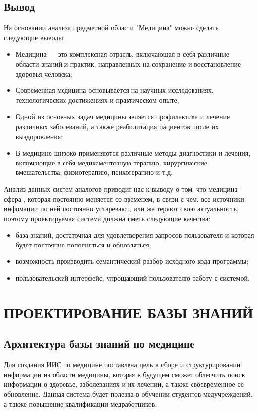 \subsection{Вывод}
На основании анализа предметной области "Медицина" можно сделать следующие выводы:

\begin{itemize}
	\item Медицина — это комплексная отрасль, включающая в себя различные области знаний и практик, направленных на сохранение и восстановление здоровья человека;
	
	\item Современная медицина основывается на научных исследованиях, технологических достижениях и практическом опыте;
	
	\item Одной из основных задач медицины является профилактика и лечение различных заболеваний, а также реабилитация пациентов после их выздоровления;
	
	\item В медицине широко применяются различные методы диагностики и лечения, включающие в себя медикаментозную терапию, хирургические вмешательства, физиотерапию, психотерапию и т.д.
\end{itemize}{}
Анализ данных систем-аналогов приводит нас к выводу о том, что медицина - сфера , которая постоянно меняется со временем, в связи с чем, все источники инфомации по ней постоянно устаревают, или же теряют свою актуальность, поэтому проектируемая система должна иметь следующие качества:
\begin{itemize}
	\item {база знаний, достаточная для удовлетворения запросов пользователя и которая будет постоянно пополняться и обновляться;}
	
	\item{возможность производить семантический разбор исходного кода программы;}
	
	\item{пользовательский интерфейс, упрощающий пользователю работу с системой.}
\end{itemize}

\section{ПРОЕКТИРОВАНИЕ БАЗЫ ЗНАНИЙ}
\subsection{Архитектура базы знаний по медицине}
Для создания ИИС по медицине поставлена цель в сборе и структурировании информации из области медицины, которая в будущем сможет облегчить поиск информации о здоровье, заболеваниях и их лечении, а также своевременное её обновление. Данная система будет полезна в обучении студентов медучреждений, а также повышение квалификации медработников.

